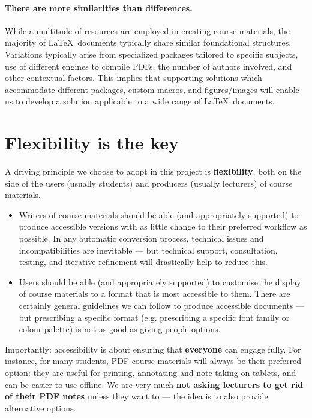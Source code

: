 \paragraph{There are more similarities than differences.} While a multitude of resources are employed in creating course materials, the majority of \LaTeX\ documents typically share similar foundational structures. Variations typically arise from specialized packages tailored to specific subjects, use of different engines to compile PDFs, the number of authors involved, and other contextual factors. This implies that supporting solutions which accommodate different packages, custom macros, and figures/images will enable us to develop a solution applicable to a wide range of \LaTeX\ documents.


\section{Flexibility is the key}
\label{sec:context:flex}

A driving principle we choose to adopt in this project is \textbf{flexibility}, both on the side of the users (usually students) and producers (usually lecturers) of course materials.

\begin{itemize}
    \item Writers of course materials should be able (and appropriately supported) to produce accessible versions with as little change to their preferred workflow as possible. In any automatic conversion process, technical issues and incompatibilities are inevitable --- but technical support, consultation, testing, and iterative refinement will drastically help to reduce this.
    \item Users should be able (and appropriately supported) to customise the display of course materials to a format that is most accessible to them. There are certainly general guidelines we can follow to produce accessible documents --- but prescribing a specific format (e.g. prescribing a specific font family or colour palette) is not as good as giving people options.
\end{itemize}

Importantly: accessibility is about ensuring that \textbf{everyone} can engage fully. For instance, for many students, PDF course materials will always be their preferred option: they are useful for printing, annotating and note-taking on tablets, and can be easier to use offline. We are very much \textbf{not asking lecturers to get rid of their PDF notes} unless they want to --- the idea is to also provide alternative options.
